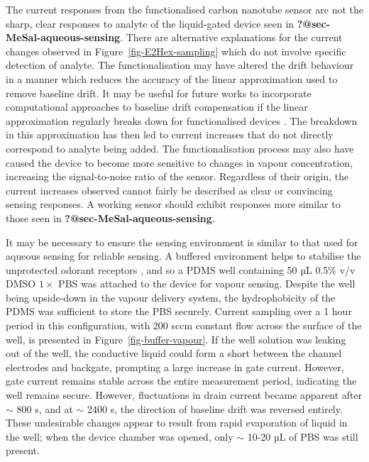 \documentclass[
  a4paper,
]{scrbook}
\begin{document}
The current responses from the functionalised carbon nanotube sensor are
not the sharp, clear responses to analyte of the liquid-gated device
seen in \textbf{?@sec-MeSal-aqueous-sensing}. There are alternative
explanations for the current changes observed in
Figure~\ref{fig-E2Hex-sampling} which do not involve specific detection
of analyte. The functionalisation may have altered the drift behaviour
in a manner which reduces the accuracy of the linear approximation used
to remove baseline drift. It may be useful for future works to
incorporate computational approaches to baseline drift compensation if
the linear approximation regularly breaks down for functionalised
devices \autocite{Zhang2022}. The breakdown in this approximation has
then led to current increases that do not directly correspond to analyte
being added. The functionalisation process may also have caused the
device to become more sensitive to changes in vapour concentration,
increasing the signal-to-noise ratio of the sensor. Regardless of their
origin, the current increases observed cannot fairly be described as
clear or convincing sensing responses. A working sensor should exhibit
responses more similar to those seen in
\textbf{?@sec-MeSal-aqueous-sensing}.

It may be necessary to ensure the sensing environment is similar to that
used for aqueous sensing for reliable sensing. A buffered environment
helps to stabilise the unprotected odorant receptors
\autocite{Sato2014}, and so a PDMS well containing 50 µL 0.5\% v/v DMSO
\(1 \times\) PBS was attached to the device for vapour sensing. Despite
the well being upside-down in the vapour delivery system, the
hydrophobicity of the PDMS was sufficient to store the PBS securely.
Current sampling over a 1 hour period in this configuration, with 200
sccm constant flow across the surface of the well, is presented in
Figure~\ref{fig-buffer-vapour}. If the well solution was leaking out of
the well, the conductive liquid could form a short between the channel
electrodes and backgate, prompting a large increase in gate current.
However, gate current remains stable across the entire measurement
period, indicating the well remains secure. However, fluctuations in
drain current became apparent after \(\sim\) 800 s, and at \(\sim\) 2400
s, the direction of baseline drift was reversed entirely. These
undesirable changes appear to result from rapid evaporation of liquid in
the well; when the device chamber was opened, only \(\sim\) 10-20 µL of
PBS was still present.
\end{document}
